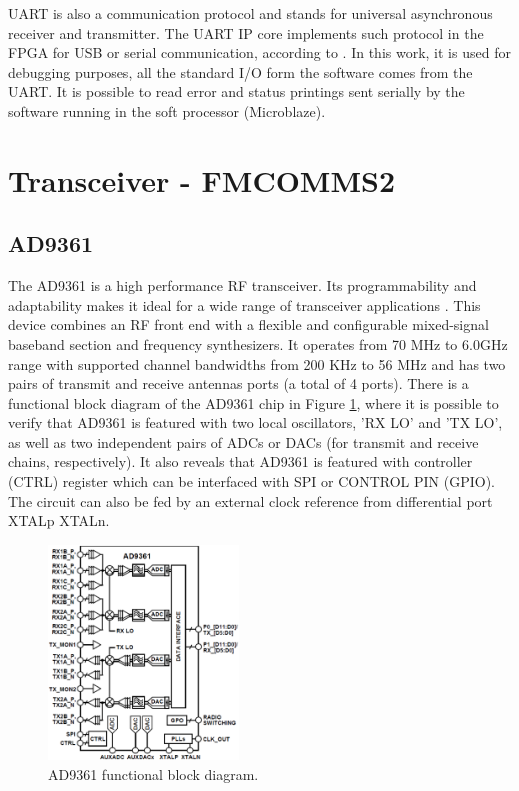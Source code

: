 UART is also a communication protocol and stands for universal asynchronous
receiver and transmitter. The UART IP core implements such protocol in the
FPGA for USB or serial communication, according to \cite{xilinx:axiuart}. In
this work, it is used for debugging purposes, all the standard I/O form the
software comes from the UART. It is possible to read error and status
printings sent serially by the software running in the soft processor
(Microblaze).

\section{Transceiver - FMCOMMS2}

\subsection{AD9361}
\label{trans:ad9361}

The AD9361 is a high performance RF transceiver. Its programmability and
adaptability makes it ideal for a wide range of transceiver applications
\cite{web:ad9361wiki}. This device combines an RF front end with a flexible and
configurable mixed-signal baseband section and frequency synthesizers. It
operates from 70 MHz to 6.0GHz range with supported channel bandwidths from 200
KHz to 56 MHz and has two pairs of transmit and receive antennas ports (a total
of 4 ports). There is a functional block diagram of the AD9361 chip in Figure
\ref{fig:ad9361func}, where it is possible to verify that AD9361 is featured with
two local oscillators, 'RX LO' and 'TX LO', as well as two independent pairs of
ADCs or DACs (for transmit and receive chains, respectively). It also reveals
that AD9361 is featured with controller (CTRL) register which can be interfaced
with SPI or CONTROL PIN (GPIO). The circuit can also be fed by an external clock
reference from differential port XTALp XTALn.

\begin{figure}[htbp]
    \centering
    \includegraphics[width=0.45\textwidth]{./figures/ad9361_functional_diagram}
    \caption{ AD9361 functional block diagram.
    \label{fig:ad9361func}}
\end{figure}

